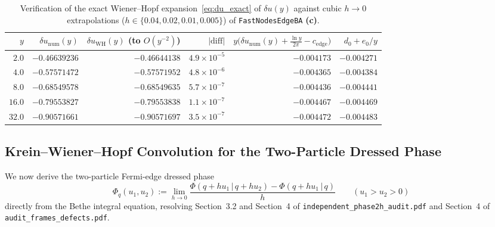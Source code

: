 \documentclass[11pt,a4paper]{article}
\newcommand{\Lc}{\textsf{\textbf{(c)}}}
\theoremstyle{remark}
\begin{document}
\begin{table}[htbp]
\centering\small
\caption{Verification of the exact Wiener--Hopf expansion~\eqref{eq:du_exact} of $\delta u(y)$
against cubic $h\to 0$ extrapolations ($h \in \{0.04,0.02,0.01,0.005\}$) of \texttt{FastNodesEdgeBA} \Lc.}
\label{tab:du_check}
\begin{tabular}{@{}rrrrrr@{}}
\toprule
$y$ & $\delta u_{\mathrm{num}}(y)$ & $\delta u_{\mathrm{WH}}(y)$ (to $O(y^{-2})$) & $|\text{diff}|$ &
$y\big(\delta u_{\mathrm{num}}(y)+\frac{\ln y}{2\pi}-c_{\mathrm{edge}}\big)$ & $d_0 + e_0/y$ \\
\midrule
$2.0$  & $-0.46639236$ & $-0.46644138$ & $4.9\times 10^{-5}$ & $-0.004173$ & $-0.004271$ \\
$4.0$  & $-0.57571472$ & $-0.57571952$ & $4.8\times 10^{-6}$ & $-0.004365$ & $-0.004384$ \\
$8.0$  & $-0.68549578$ & $-0.68549635$ & $5.7\times 10^{-7}$ & $-0.004436$ & $-0.004441$ \\
$16.0$ & $-0.79553827$ & $-0.79553838$ & $1.1\times 10^{-7}$ & $-0.004467$ & $-0.004469$ \\
$32.0$ & $-0.90571661$ & $-0.90571697$ & $3.5\times 10^{-7}$ & $-0.004472$ & $-0.004483$ \\
\bottomrule
\end{tabular}
\end{table}

\subsection{Krein--Wiener--Hopf Convolution for the Two-Particle Dressed Phase}
We now derive the two-particle Fermi-edge dressed phase
\begin{equation}
  \Phi_q(u_1,u_2) := \lim_{h\to 0}\frac{\Phi(q+hu_1\,|\,q+hu_2) - \Phi(q+hu_1\,|\,q)}{h} \qquad (u_1 > u_2 > 0)
\end{equation}
directly from the Bethe integral equation, resolving Section~3.2 and Section~4 of
\texttt{independent\_phase2h\_audit.pdf} and Section~4 of \texttt{audit\_frames\_defects.pdf}.
\end{document}
